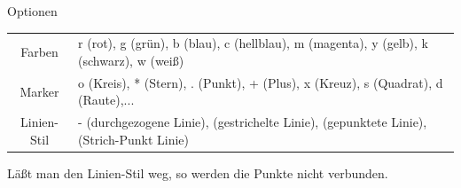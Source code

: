 \documentclass[hyperref={xetex}]{beamer}
\begin{document}
% 
% 
\begin{frame}[fragile]{Optionen}
\begin{tabular}{cp{8.5cm}}
\alert{ Farben} & r (rot), g (grün), b (blau), c (hellblau), m (magenta),
  y (gelb), k (schwarz), w (weiß)\\
\alert{ Marker} & o (Kreis), * (Stern), . (Punkt), + (Plus), x (Kreuz), s
  (Quadrat), d (Raute),... \\
\alert{ Linien-Stil} &  - (durchgezogene Linie), \mcode{--} (gestrichelte
  Linie), \mcode{:} (gepunktete Linie), \mcode{-.} (Strich-Punkt Linie)\\
\end{tabular}

Läßt man den Linien-Stil weg, so werden die Punkte nicht verbunden.
\end{frame}
\end{document}
